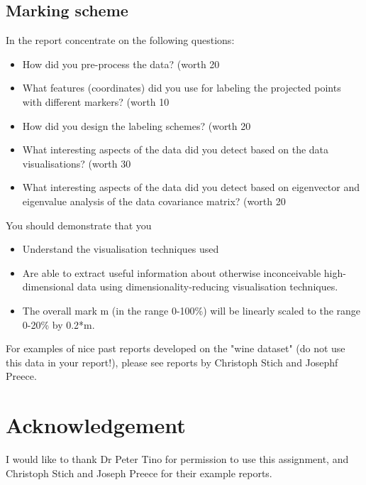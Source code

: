 \documentclass[preprint,12pt]{elsarticle}
\begin{document}
\subsection{Marking scheme}
\label{ss:marking}
In the report concentrate on the following questions:
\begin{itemize}
    \item How did you pre-process the data? (worth 20%
    \item What features (coordinates) did you use for labeling the projected points with different markers? (worth 10%
    \item How did you design the labeling schemes? (worth 20%
    \item What interesting aspects of the data did you detect based on the data visualisations? (worth 30%
    \item What interesting aspects of the data did you detect based on eigenvector and eigenvalue analysis of the data covariance matrix? (worth 20%
\end{itemize}
You should demonstrate that you
\begin{itemize}
    \item Understand the visualisation techniques used
    \item Are able to extract useful information about otherwise inconceivable high-dimensional data using dimensionality-reducing visualisation techniques.
    \item The overall mark m (in the range 0-100\%) will be linearly scaled to the range 0-20\% by 0.2*m.
\end{itemize}
For examples of nice past reports developed on the "wine dataset" (do not use this data in your report!), please see reports by Christoph Stich and Josephf Preece.

\section{Acknowledgement}
\label{s:acknowledge}
I would like to thank Dr Peter Tino for permission to use this assignment, and Christoph Stich and Joseph Preece for their example reports.
\end{document}
